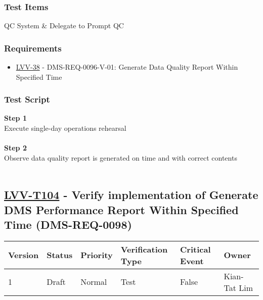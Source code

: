 \hypertarget{test-items-79}{%
\subsubsection{Test Items}\label{test-items-79}}

QC System \& Delegate to Prompt QC

\hypertarget{requirements-80}{%
\subsubsection{Requirements}\label{requirements-80}}

\begin{itemize}
\tightlist
\item
  \href{https://jira.lsstcorp.org/browse/LVV-38}{LVV-38} -
  DMS-REQ-0096-V-01: Generate Data Quality Report Within Specified Time
\end{itemize}

\hypertarget{test-script-80}{%
\subsubsection{Test Script}\label{test-script-80}}

\textbf{Step 1}\\
Execute single-day operations rehearsal\\
~\\
\textbf{Step 2}\\
Observe data quality report is generated on time and with correct
contents\\
~\\

\hypertarget{lvv-t104---verify-implementation-of-generate-dms-performance-report-within-specified-time-dms-req-0098}{%
\subsection{\texorpdfstring{\href{https://jira.lsstcorp.org/secure/Tests.jspa\#/testCase/LVV-T104}{LVV-T104}
- Verify implementation of Generate DMS Performance Report Within
Specified Time
(DMS-REQ-0098)}{LVV-T104 - Verify implementation of Generate DMS Performance Report Within Specified Time (DMS-REQ-0098)}}\label{lvv-t104---verify-implementation-of-generate-dms-performance-report-within-specified-time-dms-req-0098}}

\begin{longtable}[]{@{}llllll@{}}
\toprule
Version & Status & Priority & Verification Type & Critical Event &
Owner\tabularnewline
\midrule
\endhead
1 & Draft & Normal & Test & False & Kian-Tat Lim\tabularnewline
\bottomrule
\end{longtable}

